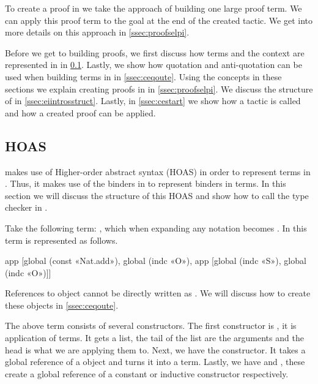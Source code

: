 \documentclass[thesis.tex]{subfiles}
\begin{document}
{{To create a proof in \elpi we take the approach of building one large proof term. We can apply this proof term to the goal at the end of the created tactic. We get into more details on this approach in \cref{ssec:proofselpi}.

Before we get to building proofs, we first discuss how \coq terms and the \coq context are represented in \elpi in \cref{ssec:cehoas}. Lastly, we show how quotation and anti-quotation can be used when building \coq terms in \elpi in \cref{ssec:ceqoute}. Using the concepts in these sections we explain creating proofs in \elpi in \cref{ssec:proofselpi}. We discuss the structure of  in \cref{ssec:eiintrosstruct}. Lastly, in \cref{ssec:cestart} we show how a tactic is called and how a created proof can be applied.


\subsection{\ce HOAS} \label{ssec:cehoas}
\ce makes use of Higher-order abstract syntax (HOAS) in order to represent \coq terms in \elpi. Thus, it makes use of the binders in \elpi to represent binders in \coq terms. In this section we will discuss the structure of this HOAS and show how to call the \coq type checker in \elpi.

Take the following \coq term: , which when expanding any notation becomes . In \elpi this term is represented as follows.
\begin{elpicode}
  app [global (const «Nat.add»), 
      global (indc «O»), 
      app [global (indc «S»), global (indc «O»)]]
\end{elpicode}
References to \coq object cannot be directly written as . We will discuss how to create these objects in \cref{ssec:ceqoute}.

The above \elpi term consists of several constructors. The first constructor is , it is application of \coq terms. It gets a list, the tail of the list are the arguments and the head is what we are applying them to. Next, we have the  constructor. It takes a global reference of a \coq object and turns it into a term. Lastly, we have  and , these create a global reference of a constant or inductive constructor respectively.

}}
\end{document}
